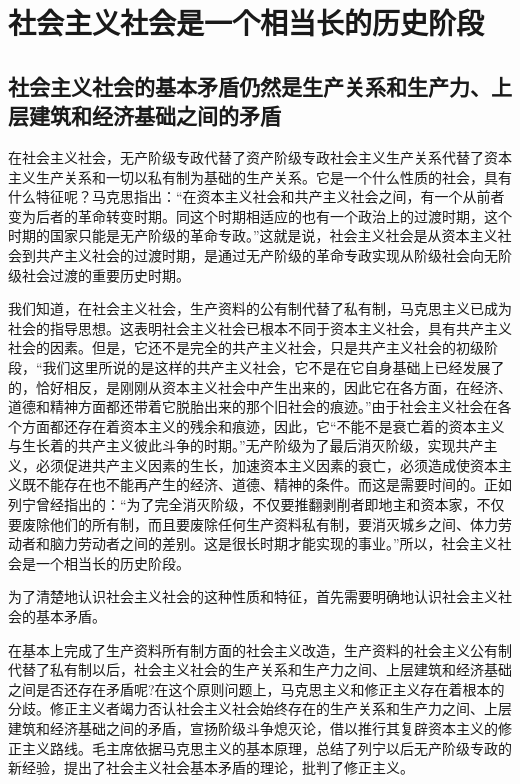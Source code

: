 \documentclass{book}
\begin{document}
\section{社会主义社会是一个相当长的历史阶段}

\subsection{社会主义社会的基本矛盾仍然是生产关系和生产力、上层建筑和经济基础之间的矛盾}

在社会主义社会，无产阶级专政代替了资产阶级专政社会主义生产关系代替了资本主义生产关系和一切以私有制为基础的生产关系。它是一个什么性质的社会，具有什么特征呢？马克思指出：“在资本主义社会和共产主义社会之间，有一个从前者变为后者的革命转变时期。同这个时期相适应的也有一个政治上的过渡时期，这个时期的国家只能是无产阶级的革命专政。”这就是说，社会主义社会是从资本主义社会到共产主义社会的过渡时期，是通过无产阶级的革命专政实现从阶级社会向无阶级社会过渡的重要历史时期。

我们知道，在社会主义社会，生产资料的公有制代替了私有制，马克思主义已成为社会的指导思想。这表明社会主义社会已根本不同于资本主义社会，具有共产主义社会的因素。但是，它还不是完全的共产主义社会，只是共产主义社会的初级阶段，“我们这里所说的是这样的共产主义社会，它不是在它自身基础上已经发展了的，恰好相反，是刚刚从资本主义社会中产生出来的，因此它在各方面，在经济、道德和精神方面都还带着它脱胎出来的那个旧社会的痕迹。”由于社会主义社会在各个方面都还存在着资本主义的残余和痕迹，因此，它“不能不是衰亡着的资本主义与生长着的共产主义彼此斗争的时期。”无产阶级为了最后消灭阶级，实现共产主义，必须促进共产主义因素的生长，加速资本主义因素的衰亡，必须造成使资本主义既不能存在也不能再产生的经济、道德、精神的条件。而这是需要时间的。正如列宁曾经指出的：“为了完全消灭阶级，不仅要推翻剥削者即地主和资本家，不仅要废除他们的所有制，而且要废除任何生产资料私有制，要消灭城乡之间、体力劳动者和脑力劳动者之间的差别。这是很长时期才能实现的事业。”所以，社会主义社会是一个相当长的历史阶段。

为了清楚地认识社会主义社会的这种性质和特征，首先需要明确地认识社会主义社会的基本矛盾。

在基本上完成了生产资料所有制方面的社会主义改造，生产资料的社会主义公有制代替了私有制以后，社会主义社会的生产关系和生产力之间、上层建筑和经济基础之间是否还存在矛盾呢?在这个原则问题上，马克思主义和修正主义存在着根本的分歧。修正主义者竭力否认社会主义社会始终存在的生产关系和生产力之间、上层建筑和经济基础之间的矛盾，宣扬阶级斗争熄灭论，借以推行其复辟资本主义的修正主义路线。毛主席依据马克思主义的基本原理，总结了列宁以后无产阶级专政的新经验，提出了社会主义社会基本矛盾的理论，批判了修正主义。
\end{document}
